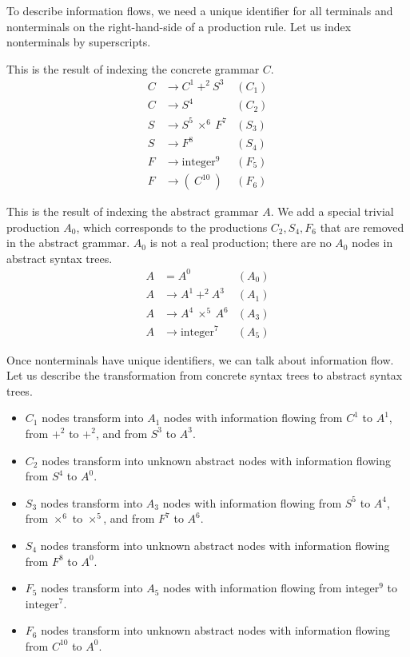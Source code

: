 \documentclass{amsart}
\gdef\R{\rightarrow}
\begin{document}
To describe information flows, we need a unique identifier for
all terminals and nonterminals on the right-hand-side of a
production rule. Let us index nonterminals by superscripts.

This is the result of indexing the concrete grammar $C$.
\begin{align*}
C &\R C^1~+^2~S^3 & (C_1) \\
C &\R S^4     & (C_2) \\
S &\R S^5~\times^6~F^7 & (S_3) \\
S &\R F^8     & (S_4) \\
F &\R \mbox{integer}^9 & (F_5) \\
F &\R (~C^{10}~) & (F_6)
\end{align*}

This is the result of indexing the abstract grammar $A$. We add
a special trivial production $A_0$, which corresponds to the
productions $C_2,S_4,F_6$ that are removed in the abstract
grammar. $A_0$ is not a real production; there are no $A_0$ nodes
in abstract syntax trees.
\begin{align*}
A &= A^0       & (A_0) \\
A &\R A^1~+^2~A^3 & (A_1) \\
A &\R A^4~\times^5~A^6 & (A_3) \\
A &\R \mbox{integer}^7 & (A_5)
\end{align*}

Once nonterminals have unique identifiers, we can talk about
information flow. Let us describe the transformation from
concrete syntax trees to abstract syntax trees.
\begin{itemize}
\item $C_1$ nodes transform into $A_1$ nodes with information
flowing from $C^1$ to $A^1$, from $+^2$ to $+^2$, and from $S^3$
to $A^3$.
\item $C_2$ nodes transform into unknown abstract nodes with
information flowing from $S^4$ to $A^0$.
\item $S_3$ nodes transform into $A_3$ nodes with information
flowing from $S^5$ to $A^4$, from $\times^6$ to $\times^5$, and
from $F^7$ to $A^6$.
\item $S_4$ nodes transform into unknown abstract nodes with
information flowing from $F^8$ to $A^0$.
\item $F_5$ nodes transform into $A_5$ nodes with information
flowing from $\mbox{integer}^9$ to $\mbox{integer}^7$.
\item $F_6$ nodes transform into unknown abstract nodes with
information flowing from $C^{10}$ to $A^0$.
\end{itemize}
\end{document}
